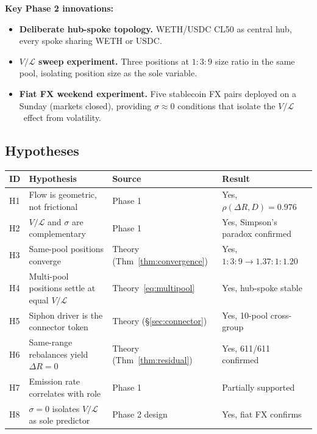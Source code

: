 \documentclass[11pt,a4paper]{article}
\begin{document}
\textbf{Key Phase 2 innovations:}

\begin{itemize}[leftmargin=*]
    \item \textbf{Deliberate hub-spoke topology.} WETH/USDC CL50 as central hub, every spoke sharing WETH or USDC.
    \item \textbf{$V/\mathcal{L}$ sweep experiment.} Three positions at $1{:}3{:}9$ size ratio in the same pool, isolating position size as the sole variable.
    \item \textbf{Fiat FX weekend experiment.} Five stablecoin FX pairs deployed on a Sunday (markets closed), providing $\sigma \approx 0$ conditions that isolate the $V/\mathcal{L}$~effect from volatility.
\end{itemize}

\subsection{Hypotheses}\label{sec:hypotheses}

\begin{table}[H]
\centering\small
\begin{tabular}{@{}lp{6.4cm}lp{4cm}@{}}
\toprule
ID & Hypothesis & Source & Result \\
\midrule
H1 & Flow is geometric, not frictional       & Phase 1            & Yes, $\rho(\Delta R, D) = 0.976$ \\
H2 & $V/\mathcal{L}$ and $\sigma$ are complementary    & Phase 1            & Yes, Simpson's paradox confirmed \\
H3 & Same-pool positions converge            & Theory (Thm~\ref{thm:convergence}) & Yes, $1{:}3{:}9 \to 1.37{:}1{:}1.20$ \\
H4 & Multi-pool positions settle at equal $V/\mathcal{L}$ & Theory~\eqref{eq:multipool} & Yes, hub-spoke stable \\
H5 & Siphon driver is the connector token    & Theory (\S\ref{sec:connector}) & Yes, 10-pool cross-group \\
H6 & Same-range rebalances yield $\Delta R = 0$ & Theory (Thm~\ref{thm:residual}) & Yes, 611/611 confirmed \\
H7 & Emission rate correlates with role      & Phase 1            & Partially supported \\
H8 & $\sigma = 0$ isolates $V/\mathcal{L}$ as sole predictor & Phase 2 design & Yes, fiat FX confirms \\
\bottomrule
\end{tabular}
\end{table}
\end{document}
